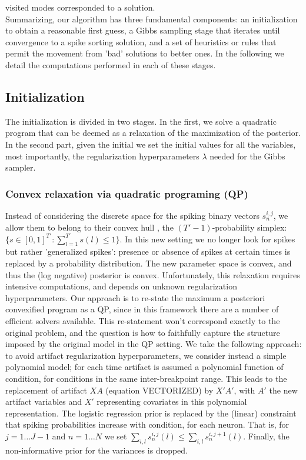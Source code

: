 \documentclass[12pt,letterpaper,fleqn]{article}
\begin{document}
visited modes corresponded to a solution.\\


Summarizing, our algorithm has three fundamental components: an initialization to obtain a reasonable first guess, a Gibbs sampling stage that iterates until convergence to a spike sorting solution, and a set of heuristics or rules that permit the movement from 'bad' solutions to better ones. In the following we detail the computations performed in each of these stages.

 \subsection{Initialization}
The initialization is divided in two stages. In the first, we solve a quadratic program \cite{BoydEtal04} that can be deemed as a relaxation of the maximization of the posterior.  In the second part, given the initial we set the initial values for all the variables, most importantly, the regularization hyperparameters $\lambda$ needed for the Gibbs sampler.
 \subsubsection{Convex relaxation via quadratic programing (QP)}
 
Instead of considering the discrete space for the spiking binary vectors $s_n^{i,j}$, we allow them to belong to their convex hull \cite{Rockafellar70}, the $(T'-1)$-probability simplex: $\{ s\in [0,1]^{T'}:  \sum_{l=1}^{T'} s(l)\leq 1\}$. In this new setting we no longer look for spikes but rather 'generalized spikes': presence or absence of spikes at certain times is replaced by a probability distribution. The new parameter space is convex, and thus the (log negative) posterior is convex. Unfortunately, this relaxation requires  intensive computations, and depends on unknown regularization hyperparameters. Our approach is to re-state the maximum a posteriori convexified program as a QP, since in this framework there are a number of efficient solvers available. This re-statement won't correspond exactly to the original problem, and the question is how to faithfully capture the structure imposed by the original model in the QP setting. We take the following approach: to avoid artifact regularization hyperparameters, we consider instead a simple polynomial model; for each time artifact is assumed a polynomial function of condition, for conditions in the same inter-breakpoint range. This leads to the replacement of artifact  $XA$ (equation VECTORIZED) by $X'A'$, with $A'$ the new artifact variables and $X'$ representing covariates in this polynomial representation. The logistic regression prior is replaced by the (linear) constraint that spiking probabilities increase with condition, for each neuron. That is, for $j=1\ldots J-1$ and $n=1\ldots N$ we set $\sum_{i,l}s_n^{i,j}(l) \leq \sum_{i,l}s_n^{i,j+1}(l)$. Finally, the non-informative prior for the variances is dropped.\\
\end{document}
